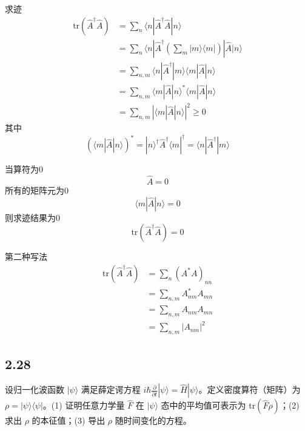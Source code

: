 求迹
\begin{equation}
    \begin{aligned}
        \mathrm{tr}\left( \hat{A}^{\dagger}\hat{A} \right) &=\sum_n{\langle n|\hat{A}^{\dagger}\hat{A}|n\rangle}
\\
&=\sum_n{\langle n|\hat{A}^{\dagger}\left( \sum_m{|m\rangle \langle m|} \right) |\hat{A}|n\rangle}
\\
&=\sum_{n,m}{\langle n|\hat{A}^{\dagger}|m\rangle \langle m|\hat{A}|n\rangle}
\\
&=\sum_{n,m}{\langle m|\hat{A}|n\rangle ^*\langle m|\hat{A}|n\rangle}
\\
&=\sum_{n,m}{\left| \langle m|\hat{A}|n\rangle \right|^2}\geqslant 0
    \end{aligned}
\end{equation}
其中
\begin{equation}
    \left( \langle m|\hat{A}|n\rangle \right) ^*=|n\rangle ^{\dagger}\hat{A}^{\dagger}\langle m|^{\dagger}=\langle n|\hat{A}^{\dagger}|m\rangle 
\end{equation}

当算符为0
\begin{equation}
    \hat{A}=0
\end{equation}
所有的矩阵元为0
\begin{equation}
    \langle m|\hat{A}|n\rangle =0
\end{equation}
则求迹结果为0
\begin{equation}
    \mathrm{tr}\left( \hat{A}^{\dagger}\hat{A} \right) =0
\end{equation}


第二种写法
\begin{equation}
    \begin{aligned}
        \mathrm{tr}\left( \hat{A}^{\dagger}\hat{A} \right) &=\sum_n{\left( A^*A \right) _{nn}}
\\
&=\sum_{n,m}{A_{nm}^{*}A_{mn}}
\\
&=\sum_{n,m}{A_{nm}A_{mn}}
\\
&=\sum_{n,m}{\left| A_{nm} \right|^2}
    \end{aligned}
\end{equation}



\newpage
\subsection{2.28}
设归一化波函数 $|\psi\rangle$ 满足薛定谔方程 $i \hbar \frac{\partial}{\partial t} |\psi\rangle = \hat{H} |\psi\rangle$。定义密度算符（矩阵）为 $\rho = |\psi\rangle \langle \psi|$。(1) 证明任意力学量 $\hat{F}$ 在 $|\psi\rangle$ 态中的平均值可表示为 tr$(\hat{F}\rho)$；(2) 求出 $\rho$ 的本征值；(3) 导出 $\rho$ 随时间变化的方程。

